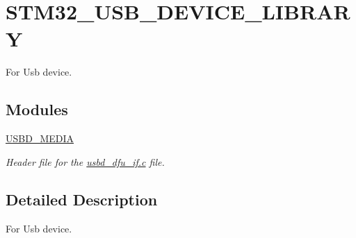 \hypertarget{group__STM32__USB__DEVICE__LIBRARY}{}\section{S\+T\+M32\+\_\+\+U\+S\+B\+\_\+\+D\+E\+V\+I\+C\+E\+\_\+\+L\+I\+B\+R\+A\+RY}
\label{group__STM32__USB__DEVICE__LIBRARY}


For Usb device.  


\subsection*{Modules}
\begin{DoxyCompactItemize}
\item 
\hyperlink{group__USBD__MEDIA}{U\+S\+B\+D\+\_\+\+M\+E\+D\+IA}
\begin{DoxyCompactList}\small\item\em Header file for the \hyperlink{usbd__dfu__if_8c}{usbd\+\_\+dfu\+\_\+if.\+c} file. \end{DoxyCompactList}\end{DoxyCompactItemize}


\subsection{Detailed Description}
For Usb device. 

